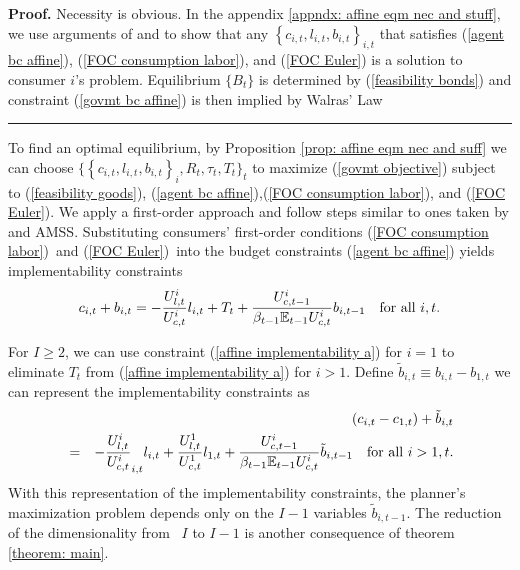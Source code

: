 \documentclass[thmsb,11pt]{article}
\newenvironment{proof}[1][Proof]{\noindent \textbf{#1.} }{\  \rule{0.5em}{0.5em}}
\begin{document}
\begin{proof}
Necessity is obvious. In the appendix \ref{appndx: affine eqm nec and stuff}, we use arguments of \cite{Magill1994} and \cite{Constantinides1996} to show that any $\left \{
c_{i,t},l_{i,t},b_{i,t}\right \} _{i,t}$ that satisfies (\ref{agent bc
affine}), (\ref{FOC consumption labor}), and (\ref{FOC Euler}) is a solution
to consumer $i$'s  problem. Equilibrium $\{B_{t}\}$ is determined by
(\ref{feasibility bonds}) and constraint (\ref{govmt bc affine}) is then
implied by Walras' Law
\end{proof}

To find an optimal equilibrium, by Proposition  \ref{prop: affine eqm nec and suff}
we can choose $\{ \left \{ c_{i,t},l_{i,t},b_{i,t}\right \} _{i},R_{t},\tau
_{t},T_{t}\}_{t}$ to maximize (\ref{govmt objective}) subject to (\ref{feasibility goods}), (\ref{agent bc affine}),(\ref{FOC consumption labor}), and (\ref{FOC Euler}).
We  apply a first-order approach and follow steps similar to ones taken by \cite{LucasJr.1983} and AMSS.
 Substituting consumers' first-order
conditions (\ref{FOC consumption labor})\ and (\ref{FOC Euler})\ into the
budget constraints (\ref{agent bc affine}) yields implementability
constraints%
\begin{equation}
c_{i,t}+b_{i,t}=-\frac{U_{l,t}^{i}}{U_{c,t}^{i}}l_{i,t}+T_{t}+\frac{%
U_{c,t-1}^{i}}{\beta_{t-1} \mathbb{E}_{t-1}U_{c,t}^{i}}b_{i,t-1}\ \text{for\ all\ }%
i,t.  \label{affine implementability a}
\end{equation}

\noindent For $I\geq 2$, we can use constraint (\ref{affine implementability
a}) for  $i=1$ to eliminate $T_{t}$ from (\ref{affine implementability a}) for $i > 1$. Define $\tilde{b}%
_{i,t}\equiv b_{i,t}-b_{1,t}$ we can represent the implementability constraints
as
\begin{eqnarray}
&&\left( c_{i,t}-c_{1,t}\right) +\tilde{b}_{i,t}
\label{affine implementability b} \\
&=&-\frac{U_{l,t}^{i}}{U_{c,t}^{i}}_{i,t}l_{i,t}+\frac{U^1_{l,t}}{U^1_{c,t}}l_{1,t} +\frac{U_{c,t-1}^{i}}{\beta_{t-1} \mathbb{E}%
_{t-1}U_{c,t}^{i}}\tilde{b}_{i,t-1}\ \text{for\ all\ }i>1,t.  \notag
\end{eqnarray}
\noindent With this representation of the implementability constraints, the planner's
maximization problem depends only on the $I-1$ variables $\tilde{b}_{i,t-1}.$
The reduction of  the dimensionality from \ $I$ to $I-1$ is
 another consequence of theorem \ref{theorem: main}.
\end{document}
